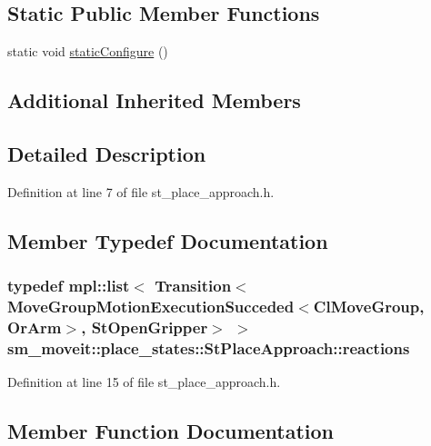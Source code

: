 \subsection*{Static Public Member Functions}
\begin{DoxyCompactItemize}
\item 
static void \hyperlink{structsm__moveit_1_1place__states_1_1StPlaceApproach_a18cfb69a3268faad24cd10e4d1ff8877}{static\+Configure} ()
\end{DoxyCompactItemize}
\subsection*{Additional Inherited Members}


\subsection{Detailed Description}


Definition at line 7 of file st\+\_\+place\+\_\+approach.\+h.



\subsection{Member Typedef Documentation}
\subsubsection[{\texorpdfstring{reactions}{reactions}}]{\setlength{\rightskip}{0pt plus 5cm}typedef mpl\+::list$<$ Transition$<${\bf Move\+Group\+Motion\+Execution\+Succeded}$<${\bf Cl\+Move\+Group}, {\bf Or\+Arm}$>$, {\bf St\+Open\+Gripper}$>$ $>$ {\bf sm\+\_\+moveit\+::place\+\_\+states\+::\+St\+Place\+Approach\+::reactions}}\hypertarget{structsm__moveit_1_1place__states_1_1StPlaceApproach_a5101ce63b524c926311a847390764fc2}{}\label{structsm__moveit_1_1place__states_1_1StPlaceApproach_a5101ce63b524c926311a847390764fc2}


Definition at line 15 of file st\+\_\+place\+\_\+approach.\+h.



\subsection{Member Function Documentation}
